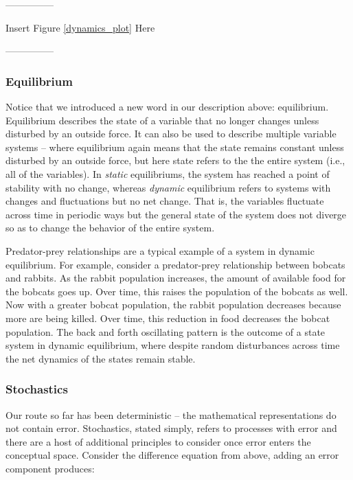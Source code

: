 \documentclass[english,,man]{apa6}
\theoremstyle{definition}
\theoremstyle{definition}
\theoremstyle{definition}
\theoremstyle{remark}
\begin{document}
\begin{center}

---------------

Insert Figure \ref{dynamics_plot} Here

---------------

\end{center}

\hypertarget{equilibrium}{%
\subsubsection{Equilibrium}\label{equilibrium}}

Notice that we introduced a new word in our description above:
equilibrium. Equilibrium describes the state of a variable that no
longer changes unless disturbed by an outside force. It can also be used
to describe multiple variable systems -- where equilibrium again means
that the state remains constant unless disturbed by an outside force,
but here state refers to the the entire system (i.e., all of the
variables). In \emph{static} equilibriums, the system has reached a
point of stability with no change, whereas \emph{dynamic} equilibrium
refers to systems with changes and fluctuations but no net change. That
is, the variables fluctuate across time in periodic ways but the general
state of the system does not diverge so as to change the behavior of the
entire system.

Predator-prey relationships are a typical example of a system in dynamic
equilibrium. For example, consider a predator-prey relationship between
bobcats and rabbits. As the rabbit population increases, the amount of
available food for the bobcats goes up. Over time, this raises the
population of the bobcats as well. Now with a greater bobcat population,
the rabbit population decreases because more are being killed. Over
time, this reduction in food decreases the bobcat population. The back
and forth oscillating pattern is the outcome of a state system in
dynamic equilibrium, where despite random disturbances across time the
net dynamics of the states remain stable.

\hypertarget{stochastics}{%
\subsubsection{Stochastics}\label{stochastics}}

Our route so far has been deterministic -- the mathematical
representations do not contain error. Stochastics, stated simply, refers
to processes with error and there are a host of additional principles to
consider once error enters the conceptual space. Consider the difference
equation from above, adding an error component produces:
\end{document}
